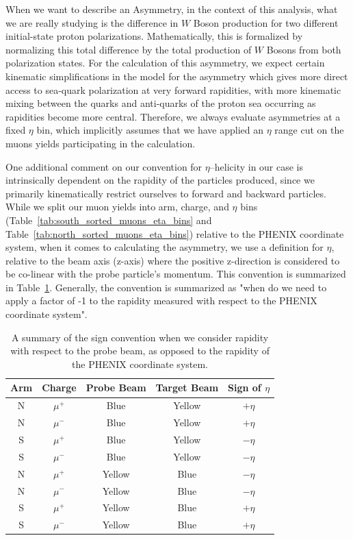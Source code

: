 When we want to describe an Asymmetry, in the context of this analysis, what we
are really studying is the difference in $W$ Boson production for two different
initial-state proton polarizations. Mathematically, this is formalized by
normalizing this total difference by the total production of $W$ Bosons from both
polarization states. For the calculation of this asymmetry, we expect certain
kinematic simplifications in the model for the asymmetry which gives more direct
access to sea-quark polarization at very forward rapidities, with more kinematic
mixing between the quarks and anti-quarks of the proton sea occurring as
rapidities become more central. Therefore, we always evaluate asymmetries at a
fixed $\eta$ bin, which implicitly assumes that we have applied an $\eta$ range
cut on the muons yields participating in the calculation.

One additional comment on our convention for $\eta$--helicity in our case is
intrinsically dependent on the rapidity of the particles produced, since we
primarily kinematically restrict ourselves to forward and backward particles.
While we split our muon yields into arm, charge, and $\eta$ bins
(Table~\ref{tab:south_sorted_muons_eta_bins} and
Table~\ref{tab:north_sorted_muons_eta_bins}) relative to the PHENIX coordinate
system, when it comes to calculating the asymmetry, we use a definition for
$\eta$, relative to the beam axis (z-axis) where the positive z-direction is
considered to be co-linear with the probe particle's momentum. This convention
is summarized in Table~\ref{tab:asymmetry_rapidity_convention}. Generally, the
convention is summarized as "when do we need to apply a factor of -1 to the
rapidity measured with respect to the PHENIX coordinate system".

\begin{table}[ht]
  \centering
  \begin{tabular}{ccccc}
    \toprule
    \textbf{Arm} & 
    \textbf{Charge} &
    \textbf{Probe Beam} & 
    \textbf{Target Beam} & 
    \textbf{Sign of $\eta$} \\
    \midrule
    N & $\mu^+$ & Blue   & Yellow & $+\eta$ \\
    N & $\mu^-$ & Blue   & Yellow & $+\eta$ \\
    S & $\mu^+$ & Blue   & Yellow & $-\eta$ \\
    S & $\mu^-$ & Blue   & Yellow & $-\eta$ \\
    N & $\mu^+$ & Yellow & Blue   & $-\eta$ \\
    N & $\mu^-$ & Yellow & Blue   & $-\eta$ \\
    S & $\mu^+$ & Yellow & Blue   & $+\eta$ \\
    S & $\mu^-$ & Yellow & Blue   & $+\eta$ \\
    \bottomrule
  \end{tabular}
  \caption{
    A summary of the sign convention when we consider rapidity with respect to
    the probe beam, as opposed to the rapidity of the PHENIX coordinate system.
  }
  \label{tab:asymmetry_rapidity_convention}

\end{table}

